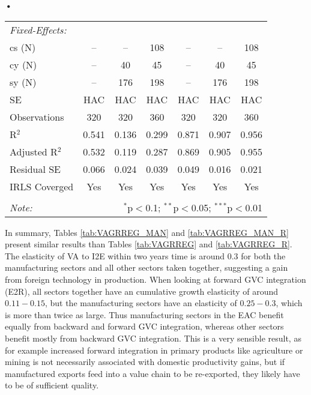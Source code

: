 \textbf{\textbf{•}}\documentclass[a4paper]{article}
\begin{document}
\begin{table}[!htbp]
{\begin{tabular}[t]{lcccccc}
\midrule \emph{Fixed-Effects:} &   &   &   &   &   &  \\
cs (N) & -- & -- & 108 & -- & -- & 108\\
cy (N) & -- & 40 & 45 & -- & 40 & 45\\
sy (N) & -- & 176 & 198 & -- & 176 & 198\\ \midrule
SE & HAC & HAC & HAC &HAC &HAC &HAC \\
Observations & 320 & 320 & 360 & 320 & 320 & 360 \\ 
R$^{2}$ & 0.541 & 0.136 & 0.299 & 0.871 & 0.907 & 0.956 \\ 
Adjusted R$^{2}$ & 0.532 & 0.119 & 0.287 & 0.869 & 0.905 & 0.955 \\ 
Residual SE & 0.066 & 0.024 & 0.039 & 0.049 & 0.016 & 0.021 \\ 
IRLS Coverged & Yes & Yes & Yes & Yes & Yes & Yes \\
\bottomrule \\ [-1em]
\textit{Note:}  & \multicolumn{6}{r}{$^{*}$p$<$0.1; $^{**}$p$<$0.05; $^{***}$p$<$0.01} \\ 
\end{tabular} 
}
\end{table} 
\FloatBarrier



In summary, Tables \ref{tab:VAGRREG_MAN} and \ref{tab:VAGRREG_MAN_R} present similar results than Tables \ref{tab:VAGRREG} and \ref{tab:VAGRREG_R}. The elasticity  of VA to I2E within two years time is around $0.3$ for both the manufacturing sectors and all other sectors taken together, suggesting a gain from foreign technology in production. When looking at forward GVC integration (E2R), all sectors together have an cumulative growth elasticity of around $0.11-0.15$, but the manufacturing sectors have an elasticity of $0.25-0.3$, which is more than twice as large. Thus manufacturing sectors in the EAC benefit equally from backward and forward GVC integration, whereas other sectors benefit mostly from backward GVC integration. This is a very sensible result, as for example increased forward integration in primary products like agriculture or mining is not necessarily associated with domestic productivity gains, but if manufactured exports feed into a value chain to be re-exported, they likely have to be of sufficient quality.  
\end{document}
